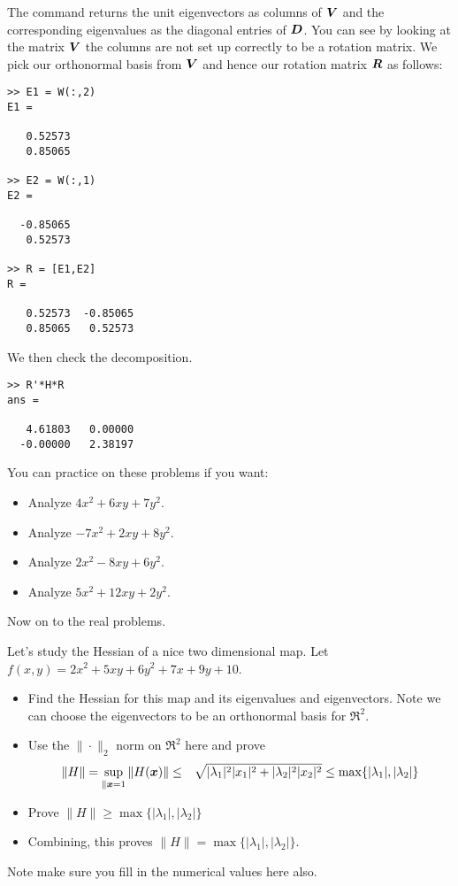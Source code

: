 \documentclass[11pt]{SelfArxOneColBMN}
\begin{document}
\noindent
The command  returns the unit eigenvectors as columns of
$\boldsymbol{V}$ and the corresponding eigenvalues as the diagonal entries of $\boldsymbol{D}$.
You can see by looking at the matrix $\boldsymbol{V}$ the columns are not set up
correctly to be a rotation matrix.
We pick our orthonormal basis from $\boldsymbol{V}$ and hence
our rotation matrix $\boldsymbol{R}$ as follows:

\begin{lstlisting}
>> E1 = W(:,2)
E1 =

   0.52573
   0.85065

>> E2 = W(:,1)
E2 =

  -0.85065
   0.52573

>> R = [E1,E2]
R =

   0.52573  -0.85065
   0.85065   0.52573
\end{lstlisting}
\lstset{fancyvrb=false}

\noindent
We then check the decomposition.

\begin{lstlisting}
>> R'*H*R
ans =

   4.61803   0.00000
  -0.00000   2.38197
\end{lstlisting}
\lstset{fancyvrb=false}

\noindent
You can practice on these problems if you want:\\

\begin{itemize}
\item Analyze $4x^2 + 6xy + 7y^2$.
\item Analyze $-7x^2 + 2xy + 8y^2$.
\item Analyze $2x^2 -8xy + 6y^2$.
\item Analyze $5x^2 + 12xy + 2y^2$.
\end{itemize}

\noindent
Now on to the real problems.

\begin{exercise}
Let's study the Hessian of a nice two dimensional map.
Let $f(x,y) = 2x^2 + 5xy + 6y^2 + 7x + 9y + 10$.
\begin{itemize}
\item Find the Hessian for this map and its eigenvalues and eigenvectors.
Note we can choose the eigenvectors to be an orthonormal basis for $\Re^2$.
\item Use the $\| \cdot\|_2$ norm on $\Re^2$ here and prove
\begin{eqnarray*}
\|H\| = \sup_{\|\boldsymbol{x} = 1} \|H(\boldsymbol{x})\| & \leq & \sqrt{|\lambda_1|^2 |x_1|^2 + |\lambda_2|^2 |x_2|^2}
\leq \max\{ |\lambda_1|,|\lambda_2|\}
\end{eqnarray*}
\item Prove $\|H\|  \geq \max\{ |\lambda_1|,|\lambda_2|\}$
\item Combining, this proves $\|H\|  = \max\{ |\lambda_1|,|\lambda_2|\}$.
\end{itemize}
\noindent
Note make sure you fill in the numerical values here also.
\end{exercise}
\end{document}
